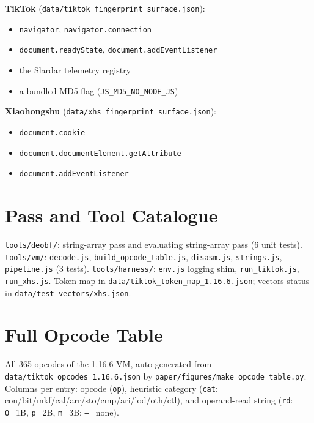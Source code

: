 \documentclass[conference,10pt]{IEEEtran}
\newcommand{\code}[1]{\texttt{\small #1}}
\begin{document}
\noindent\textbf{TikTok} (\code{data/tiktok\_fingerprint\_surface.json}):
\begin{itemize}\footnotesize\setlength\itemsep{0pt}
  \item \code{navigator}, \code{navigator.connection}
  \item \code{document.readyState}, \code{document.addEventListener}
  \item the Slardar telemetry registry
  \item a bundled MD5 flag (\code{JS\_MD5\_NO\_NODE\_JS})
\end{itemize}

\noindent\textbf{Xiaohongshu} (\code{data/xhs\_fingerprint\_surface.json}):
\begin{itemize}\footnotesize\setlength\itemsep{0pt}
  \item \code{document.cookie}
  \item \code{document.documentElement\allowbreak.getAttribute}
  \item \code{document.addEventListener}
\end{itemize}

\section{Pass and Tool Catalogue}
\code{tools/deobf/}: string-array pass and evaluating string-array pass (6 unit tests). \code{tools/vm/}: \code{decode.js}, \code{build\_opcode\_table.js}, \code{disasm.js}, \code{strings.js}, \code{pipeline.js} (3 tests). \code{tools/harness/}: \code{env.js} logging shim, \code{run\_tiktok.js}, \code{run\_xhs.js}. Token map in \code{data/tiktok\_token\_map\_1.16.6.json}; vectors status in \code{data/test\_vectors/xhs.json}.

\section{Full Opcode Table}
All 365 opcodes of the 1.16.6 VM, auto-generated from \code{data/tiktok\_opcodes\_1.16.6.json} by \code{paper/figures/make\_opcode\_table.py}. Columns per entry: opcode (\code{op}), heuristic category (\code{cat}: con/bit/mkf/cal/arr/sto/cmp/ari/lod/oth/ctl), and operand-read string (\code{rd}: \code{O}=1B, \code{p}=2B, \code{m}=3B; \code{--}=none).
\onecolumn

\end{document}
